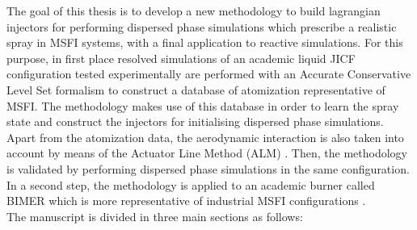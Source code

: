     
The goal of this thesis is to develop a new methodology to build lagrangian injectors for performing dispersed phase simulations which prescribe a realistic spray in MSFI systems, with a final application to reactive simulations. For this purpose, in first place resolved simulations of an academic liquid JICF configuration tested experimentally  are performed with an Accurate Conservative Level Set formalism  to construct a database of atomization representative of MSFI. The methodology makes use of this database in order to learn the spray state and construct the injectors for initialising dispersed phase simulations. Apart from the atomization data, the aerodynamic interaction is also taken into account by means of the Actuator Line Method (ALM) . Then, the methodology is validated by performing dispersed phase simulations in the same configuration. In a second step, the methodology is applied to an academic burner called BIMER which is more representative of industrial MSFI configurations . \\


The manuscript is divided in three main sections as follows:

